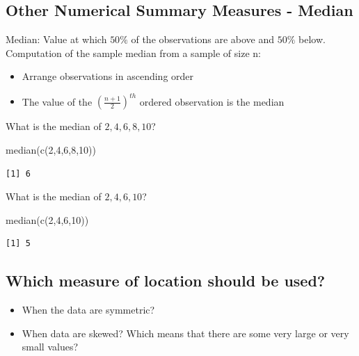 \documentclass[
  letterpaper,
  DIV=11,
  numbers=noendperiod]{scrartcl}
\newenvironment{Shaded}{\begin{snugshade}}{\end{snugshade}}
\newcommand{\DecValTok}[1]{\textcolor[rgb]{0.68,0.00,0.00}{#1}}
\newcommand{\FunctionTok}[1]{\textcolor[rgb]{0.28,0.35,0.67}{#1}}
\newcommand{\NormalTok}[1]{\textcolor[rgb]{0.00,0.23,0.31}{#1}}
\begin{document}
\subsection{Other Numerical Summary Measures -
Median}\label{other-numerical-summary-measures---median}

{Median:} Value at which \(50\%\) of the observations are above and
\(50\%\) below.\\
Computation of the sample median from a sample of size n:

\begin{itemize}
\item
  Arrange observations in ascending order
\item
  The value of the \(\left(\frac{n+1}{2}\right)^{th}\) ordered
  observation is the median
\end{itemize}

What is the median of \(2,4,6,8,10\)?

\begin{Shaded}
\begin{Highlighting}[]
\FunctionTok{median}\NormalTok{(}\FunctionTok{c}\NormalTok{(}\DecValTok{2}\NormalTok{,}\DecValTok{4}\NormalTok{,}\DecValTok{6}\NormalTok{,}\DecValTok{8}\NormalTok{,}\DecValTok{10}\NormalTok{))}
\end{Highlighting}
\end{Shaded}

\begin{verbatim}
[1] 6
\end{verbatim}

What is the median of \(2,4,6,10\)?

\begin{Shaded}
\begin{Highlighting}[]
\FunctionTok{median}\NormalTok{(}\FunctionTok{c}\NormalTok{(}\DecValTok{2}\NormalTok{,}\DecValTok{4}\NormalTok{,}\DecValTok{6}\NormalTok{,}\DecValTok{10}\NormalTok{))}
\end{Highlighting}
\end{Shaded}

\begin{verbatim}
[1] 5
\end{verbatim}

\subsection{Which measure of location should be
used?}\label{which-measure-of-location-should-be-used}

\begin{itemize}
\item
  When the data are symmetric?
\item
  When data are skewed? Which means that there are some very large or
  very small values?
\end{itemize}
\end{document}
